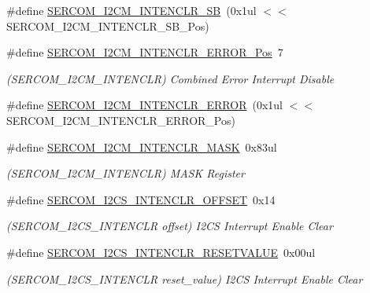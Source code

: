 \begin{DoxyCompactItemize}
\#define \mbox{\hyperlink{group___s_a_m_d21___s_e_r_c_o_m_gac95c28f730d40bdcc41ec98d95d57feb}{S\+E\+R\+C\+O\+M\+\_\+\+I2\+C\+M\+\_\+\+I\+N\+T\+E\+N\+C\+L\+R\+\_\+\+SB}}~(0x1ul $<$$<$ S\+E\+R\+C\+O\+M\+\_\+\+I2\+C\+M\+\_\+\+I\+N\+T\+E\+N\+C\+L\+R\+\_\+\+S\+B\+\_\+\+Pos)
\item 
\#define \mbox{\hyperlink{group___s_a_m_d21___s_e_r_c_o_m_gab5418c08d73f080d3b929529139f1bca}{S\+E\+R\+C\+O\+M\+\_\+\+I2\+C\+M\+\_\+\+I\+N\+T\+E\+N\+C\+L\+R\+\_\+\+E\+R\+R\+O\+R\+\_\+\+Pos}}~7
\begin{DoxyCompactList}\small\item\em (S\+E\+R\+C\+O\+M\+\_\+\+I2\+C\+M\+\_\+\+I\+N\+T\+E\+N\+C\+LR) Combined Error Interrupt Disable \end{DoxyCompactList}\item 
\#define \mbox{\hyperlink{group___s_a_m_d21___s_e_r_c_o_m_ga6da932414282c8e88364a7d98eeb34be}{S\+E\+R\+C\+O\+M\+\_\+\+I2\+C\+M\+\_\+\+I\+N\+T\+E\+N\+C\+L\+R\+\_\+\+E\+R\+R\+OR}}~(0x1ul $<$$<$ S\+E\+R\+C\+O\+M\+\_\+\+I2\+C\+M\+\_\+\+I\+N\+T\+E\+N\+C\+L\+R\+\_\+\+E\+R\+R\+O\+R\+\_\+\+Pos)
\item 
\#define \mbox{\hyperlink{group___s_a_m_d21___s_e_r_c_o_m_ga64bc8103105ba11779a0370eea2d61ea}{S\+E\+R\+C\+O\+M\+\_\+\+I2\+C\+M\+\_\+\+I\+N\+T\+E\+N\+C\+L\+R\+\_\+\+M\+A\+SK}}~0x83ul
\begin{DoxyCompactList}\small\item\em (S\+E\+R\+C\+O\+M\+\_\+\+I2\+C\+M\+\_\+\+I\+N\+T\+E\+N\+C\+LR) M\+A\+SK Register \end{DoxyCompactList}\item 
\#define \mbox{\hyperlink{group___s_a_m_d21___s_e_r_c_o_m_ga48bacc676927e762ee71a92cf4e1620d}{S\+E\+R\+C\+O\+M\+\_\+\+I2\+C\+S\+\_\+\+I\+N\+T\+E\+N\+C\+L\+R\+\_\+\+O\+F\+F\+S\+ET}}~0x14
\begin{DoxyCompactList}\small\item\em (S\+E\+R\+C\+O\+M\+\_\+\+I2\+C\+S\+\_\+\+I\+N\+T\+E\+N\+C\+LR offset) I2\+CS Interrupt Enable Clear \end{DoxyCompactList}\item 
\#define \mbox{\hyperlink{group___s_a_m_d21___s_e_r_c_o_m_gaf1af31ee7da44fff94e4a7913138aabd}{S\+E\+R\+C\+O\+M\+\_\+\+I2\+C\+S\+\_\+\+I\+N\+T\+E\+N\+C\+L\+R\+\_\+\+R\+E\+S\+E\+T\+V\+A\+L\+UE}}~0x00ul
\begin{DoxyCompactList}\small\item\em (S\+E\+R\+C\+O\+M\+\_\+\+I2\+C\+S\+\_\+\+I\+N\+T\+E\+N\+C\+LR reset\+\_\+value) I2\+CS Interrupt Enable Clear \end{DoxyCompactList}\item 

\end{DoxyCompactItemize}
